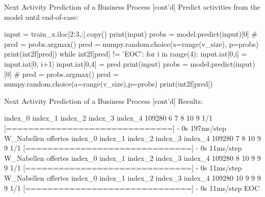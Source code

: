 \documentclass[ignorenonframetext,xcolor=x11names]{beamer}
\begin{document}
\begin{frame}[fragile]{Next Activity Prediction of a Business Process \small [cont'd]}
Predict activities from the model until end-of-case:
\begin{pythoncode}
input = train_x.iloc[2:3,:].copy()
print(input)
probs = model.predict(input)[0]
# pred = probs.argmax()
pred = numpy.random.choice(a=range(v_size), p=probs)
print(int2f[pred])
while int2f[pred] != 'EOC':
    for i in range(4):
        input.iat[0,i] = input.iat[0, i+1]
    input.iat[0,4] = pred
    print(input)
    probs = model.predict(input)[0]
    # pred = probs.argmax()
    pred = numpy.random.choice(a=range(v_size),p=probs)
    print(int2f[pred])
\end{pythoncode}
\end{frame}


\begin{frame}[fragile]{Next Activity Prediction of a Business Process \small [cont'd]}
Results:
\begin{textcode}
       index_0  index_1  index_2  index_3  index_4
109280        6        7        8       10        9
1/1 [==============================] - 0s 197ms/step
W_Nabellen offertes
        index_0  index_1  index_2  index_3  index_4
109280        7        8       10        9        9
1/1 [==============================] - 0s 11ms/step
W_Nabellen offertes
        index_0  index_1  index_2  index_3  index_4
109280        8       10        9        9        9
1/1 [==============================] - 0s 11ms/step
W_Nabellen offertes
        index_0  index_1  index_2  index_3  index_4
109280       10        9        9        9        9
1/1 [==============================] - 0s 11ms/step
EOC
\end{textcode}
\end{frame}


\end{document}
